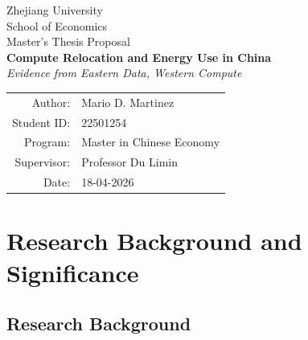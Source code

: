 \documentclass[12pt,a4paper]{article}
\begin{document}

\begin{titlepage}
\centering
\vspace*{2cm}

{\Large Zhejiang University}\\[0.3cm]
{\large School of Economics}\\[0.5cm]
{\large Master's Thesis Proposal}\\[2cm]

{\LARGE \textbf{Compute Relocation and Energy Use in China}}\\[0.5cm]
{\large \textit{Evidence from Eastern Data, Western Compute}}\\[3cm]

\begin{tabular}{r l}
Author:      & Mario D. Martinez \\[0.3cm]
Student ID:  & 22501254 \\[0.3cm]
Program:     & Master in Chinese Economy \\[0.3cm]
Supervisor:  & Professor Du Limin \\[0.3cm]
Date:        & 18-04-2026 \\
\end{tabular}

\vfill
\end{titlepage}

\newpage
\tableofcontents
\newpage



\section{Research Background and Significance}

\subsection{Research Background}

\end{document}
